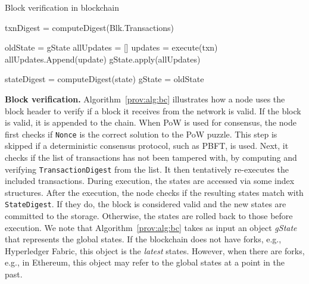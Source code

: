 \begin{algorithm}
    \caption{Block verification in blockchain}
    \label{prov:alg:bc}
  
     {
      \;
    }
  
    txnDigest = computeDigest(Blk.Transactions)\;
     {
      \;
    }
  
    oldState = gState\;
    allUpdates = []\;
     {
      updates = execute(txn)\;
      allUpdates.Append(update)\;
    }
    gState.apply(allUpdates)\;
  
    stateDigest = computeDigest(state)\;
     {
      gState = oldState\;
      \;
    } 
  \end{algorithm}

\textbf{Block verification.} Algorithm~\ref{prov:alg:bc} illustrates how a node uses the block header to verify
if a block it receives from the network is valid. If the block is valid, it is appended to the chain. When PoW
is used for consensus, the node first checks if \texttt{Nonce} is the correct solution to the PoW puzzle. This
step is skipped if a deterministic consensus protocol, such as PBFT, is used. Next, it checks if the list of
transactions has not been tampered with, by computing and verifying \texttt{TransactionDigest} from the list. It then tentatively re-executes the included transactions. During execution, the states are
accessed via some index structures.  After the execution, the node checks if the resulting states match with
\texttt{StateDigest}. If they do, the block is considered valid and the new states are committed to the
storage.  Otherwise, the states are rolled back to those before execution. We note that
Algorithm~\ref{prov:alg:bc} takes as input an object {\em gState} that represents the global states.  If the
blockchain does not have forks, e.g., Hyperledger Fabric, this object is the {\em latest} states. However, when
there are forks, e.g., in Ethereum, this object may refer to the global states at a point in the past.


